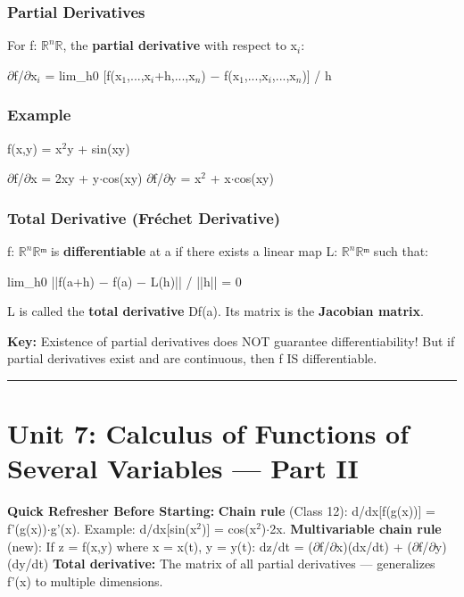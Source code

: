 \documentclass[12pt,a4paper,openany]{book}
\begin{document}
{{\subsubsection{Partial Derivatives}
For f: $\mathbb{R}^n\mathbb{R}$, the \textbf{partial derivative} with respect to x$_i$:

$\partial$f/$\partial$x$_i$ = lim_{h0} [f(x$_1$,...,x$_i$+h,...,x$_n$) − f(x$_1$,...,x$_i$,...,x$_n$)] / h

\subsubsection{Example}
f(x,y) = x$^2$y + sin(xy)

$\partial$f/$\partial$x = 2xy + y$\cdot$cos(xy)
$\partial$f/$\partial$y = x$^2$ + x$\cdot$cos(xy)

\subsubsection{Total Derivative (Fréchet Derivative) }

f: $\mathbb{R}^n\mathbb{R}$ᵐ is \textbf{differentiable} at a if there exists a linear map L: $\mathbb{R}^n\mathbb{R}$ᵐ such that:

lim_{h0} ||f(a+h) − f(a) − L(h)|| / ||h|| = 0

L is called the \textbf{total derivative} Df(a). Its matrix is the \textbf{Jacobian matrix}.

\begin{tcolorbox}[colback=warningbg!30,colframe=warningborder,title=\textbf{Important -- Exam Alert},breakable,boxrule=1.5pt]
\textbf{Key:} Existence of partial derivatives does NOT guarantee differentiability! But if partial derivatives exist and are continuous, then f IS differentiable.
\end{tcolorbox}

\bigskip\noindent\rule{\textwidth}{0.4pt}\bigskip

\section{Unit 7: Calculus of Functions of Several Variables — Part II}

\begin{prereqbox}
 \textbf{Quick Refresher Before Starting:}
\textbf{Chain rule} (Class 12): d/dx[f(g(x))] = f'(g(x))$\cdot$g'(x).
Example: d/dx[sin(x$^2$)] = cos(x$^2$)$\cdot$2x.
\textbf{Multivariable chain rule} (new): If z = f(x,y) where x = x(t), y = y(t):
dz/dt = ($\partial$f/$\partial$x)(dx/dt) + ($\partial$f/$\partial$y)(dy/dt)
\textbf{Total derivative:} The matrix of all partial derivatives — generalizes f'(x) to multiple dimensions.
\end{prereqbox}


}}
\end{document}
